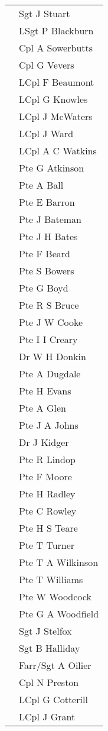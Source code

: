 \begin{center}
\begin{tabular}{rl}
    & Sgt J Stuart \\
    & LSgt P Blackburn \\
    & Cpl A Sowerbutts \\
    & Cpl G Vevers \\
    & LCpl F Beaumont \\
    & LCpl G Knowles \\
    & LCpl J McWaters \\
    & LCpl J Ward \\
    & LCpl A C Watkins \\
    & Pte G Atkinson \\
    & Pte A Ball \\
    & Pte E Barron \\
    & Pte J Bateman \\
    & Pte J H Bates \\
    & Pte F Beard \\
    & Pte S Bowers \\
    & Pte G Boyd \\
    & Pte R S Bruce \\
    & Pte J W Cooke \\
    & Pte I I Creary \\
    & Dr W H Donkin \\
    & Pte A Dugdale \\
    & Pte H Evans \\
    & Pte A Glen \\
    & Pte J A Johns \\
    & Dr J Kidger \\
    & Pte R Lindop \\
    & Pte F Moore \\
    & Pte H Radley \\
    & Pte C Rowley \\
    & Pte H S Teare \\
    & Pte T Turner \\
    & Pte T A Wilkinson \\
    & Pte T Williams \\
    & Pte W Woodcock \\
    & Pte G A Woodfield \\
    & Sgt J Stelfox \\
    & Sgt B Halliday \\
    & Farr/Sgt A Oilier \\
    & Cpl N Preston \\
    & LCpl G Cotterill \\
    & LCpl J Grant \\

\end{tabular}
\end{center}
